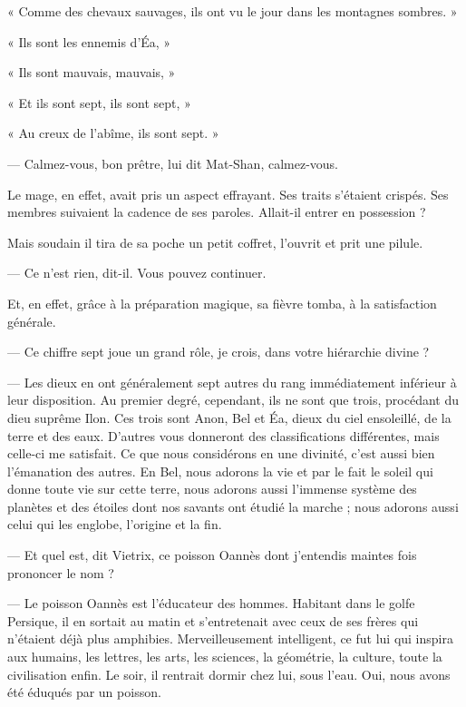 \documentclass[a4paper, 11pt, oneside, polutonikogreek, french]{article}
\begin{document}
« Comme des chevaux sauvages, ils ont vu le jour dans les montagnes sombres. »

« Ils sont les ennemis d'Éa, »

« Ils sont mauvais, mauvais, »

« Et ils sont sept, ils sont sept, »

« Au creux de l'abîme, ils sont sept. »

\bigskip
\centerline{\EightStarTaper}
\centerline{\EightStarTaper\EightStarTaper}
\bigskip

--- Calmez-vous, bon prêtre, lui dit Mat-Shan, calmez-vous.

Le mage, en effet, avait pris un aspect effrayant. Ses traits s'étaient crispés. Ses membres suivaient la cadence de ses paroles. Allait-il entrer en possession ?

Mais soudain il tira de sa poche un petit coffret, l'ouvrit et prit une pilule.

--- Ce n'est rien, dit-il. Vous pouvez continuer.

Et, en effet, grâce à la préparation magique, sa fièvre tomba, à la satisfaction générale.

\bigskip
\centerline{\EightStarTaper}
\centerline{\EightStarTaper\EightStarTaper}
\bigskip

--- Ce chiffre sept joue un grand rôle, je crois, dans votre hiérarchie divine ?

--- Les dieux en ont généralement sept autres du rang immédiatement inférieur à leur disposition. Au premier degré, cependant, ils ne sont que trois, procédant du dieu suprême Ilon. Ces trois sont Anon, Bel et Éa, dieux du ciel ensoleillé, de la terre et des eaux. D'autres vous donneront des classifications différentes, mais celle-ci me satisfait. Ce que nous considérons en une divinité, c'est aussi bien l'émanation des autres. En Bel, nous adorons la vie et par le fait le soleil qui donne toute vie sur cette terre, nous adorons aussi l'immense système des planètes et des étoiles dont nos savants ont étudié la marche ; nous adorons aussi celui qui les englobe, l'origine et la fin.

\bigskip
\centerline{\EightStarTaper}
\centerline{\EightStarTaper\EightStarTaper}
\bigskip

--- Et quel est, dit Vietrix, ce poisson Oannès dont j'entendis maintes fois prononcer le nom ?

--- Le poisson Oannès est l'éducateur des hommes. Habitant dans le golfe Persique, il en sortait au matin et s'entretenait avec ceux de ses frères qui n'étaient déjà plus amphibies. Merveilleusement intelligent, ce fut lui qui inspira aux humains, les lettres, les arts, les sciences, la géométrie, la culture, toute la civilisation enfin. Le soir, il rentrait dormir chez lui, sous l'eau. Oui, nous avons été éduqués par un poisson.
\end{document}
